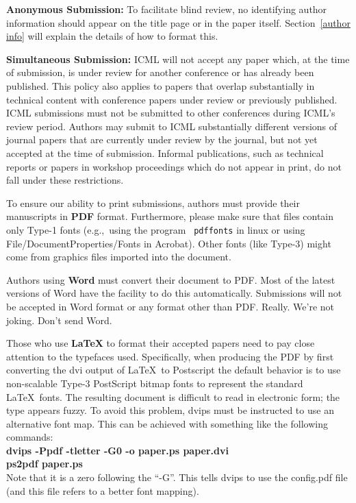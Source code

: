 \documentclass{article}
\begin{document}
{\bf Anonymous Submission:} To facilitate blind review, no identifying
author information should appear on the title page or in the paper
itself.  Section~\ref{author info} will explain the details of how to
format this.

{\bf Simultaneous Submission:} ICML will not accept any paper which,
at the time of submission, is under review for another conference or
has already been published. This policy also applies to papers that
overlap substantially in technical content with conference papers
under review or previously published. ICML submissions must not be
submitted to other conferences during ICML's review period. Authors
may submit to ICML substantially different versions of journal papers
that are currently under review by the journal, but not yet accepted
at the time of submission. Informal publications, such as technical
reports or papers in workshop proceedings which do not appear in
print, do not fall under these restrictions.

\medskip

To ensure our ability to print submissions, authors must provide their
manuscripts in \textbf{PDF} format.  Furthermore, please make sure
that files contain only Type-1 fonts (e.g.,~using the program {\tt
  pdffonts} in linux or using File/DocumentProperties/Fonts in
Acrobat).  Other fonts (like Type-3) might come from graphics files
imported into the document.

Authors using \textbf{Word} must convert their document to PDF.  Most
of the latest versions of Word have the facility to do this
automatically.  Submissions will not be accepted in Word format or any
format other than PDF. Really. We're not joking. Don't send Word.

Those who use \textbf{\LaTeX} to format their accepted papers need to
pay close attention to the typefaces used.  Specifically, when
producing the PDF by first converting the dvi output of \LaTeX\ to Postscript
the default behavior is to use non-scalable Type-3 PostScript bitmap
fonts to represent the standard \LaTeX\ fonts. The resulting document
is difficult to read in electronic form; the type appears fuzzy. To
avoid this problem, dvips must be instructed to use an alternative
font map.  This can be achieved with
something like the following commands:\\[0.5em]
{\bf dvips -Ppdf -tletter -G0 -o paper.ps paper.dvi}\\
{\bf ps2pdf paper.ps}\\[0.5em]
Note that it is a zero following the ``-G''.  This tells dvips to use
the config.pdf file (and this file refers to a better font mapping).
\end{document}
